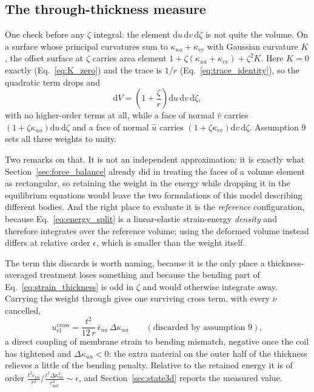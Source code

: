 \documentclass[11pt]{article}
\begin{document}
\subsection{The through-thickness measure}\label{sec:measure}
One check before any $\zeta$ integral: the element
$\mathrm du\,\mathrm dv\,\mathrm d\zeta$ is not quite the volume. On a surface
whose principal curvatures sum to $\kappa_{uu}+\kappa_{vv}$ with Gaussian
curvature $K$, the offset surface at $\zeta$ carries area element
$1+\zeta\left(\kappa_{uu}+\kappa_{vv}\right)+\zeta^{2}K$. Here $K=0$ exactly
(Eq.~\ref{eq:K_zero}) and the trace is $1/r$
(Eq.~\ref{eq:trace_identity}), so the quadratic term drops and
\begin{equation}\label{eq:volume_element}
    \boxed{\;\mathrm dV = \left(1+\frac{\zeta}{r}\right)
      \mathrm du\,\mathrm dv\,\mathrm d\zeta,\;}
\end{equation}
with no higher-order terms at all, while a face of normal $\hat v$ carries
$\left(1+\zeta\kappa_{uu}\right)\mathrm du\,\mathrm d\zeta$ and a face of normal
$\hat u$ carries $\left(1+\zeta\kappa_{vv}\right)\mathrm dv\,\mathrm d\zeta$.
Assumption 9 sets all three weights to unity.

Two remarks on that. It is not an independent approximation: it is exactly what
Section~\ref{sec:force_balance} already did in treating the faces of a volume
element as rectangular, so retaining the weight in the energy while dropping it
in the equilibrium equations would leave the two formulations of this model
describing different bodies. And the right place to evaluate it is the
\emph{reference} configuration, because Eq.~\eqref{eq:energy_split} is a
linear-elastic strain-energy \emph{density} and therefore integrates over the
reference volume; using the deformed volume instead differs at relative order
$\epsilon$, which is smaller than the weight itself.

The term this discards is worth naming, because it is the only place a
thickness-averaged treatment loses something and because the bending part of
Eq.~\eqref{eq:strain_thickness} is odd in $\zeta$ and would otherwise integrate
away. Carrying the weight through gives one surviving cross term, with every
$\nu$ cancelled,
\begin{equation}\label{eq:jacobian_cross}
    u_{\mathrm{el}}^{\mathrm{cross}}
      = \frac{t^{2}}{12\,r}\,\bar\epsilon_{uu}\,\Delta\kappa_{uu}
      \qquad\left(\text{discarded by assumption 9}\right),
\end{equation}
a direct coupling of membrane strain to bending mismatch, negative once the coil
has tightened and $\Delta\kappa_{uu}<0$: the extra material on the outer half of
the thickness relieves a little of the bending penalty. Relative to the retained
energy it is of order $\frac{t^{2}\bar\epsilon_{uu}}{r^{2}}
\big/\frac{t^{2}\Delta\kappa_{uu}^{2}}{r_{\mathrm{nat}}^{2}}
\sim \epsilon$, and Section~\ref{sec:state3d} reports the measured value.
\end{document}
